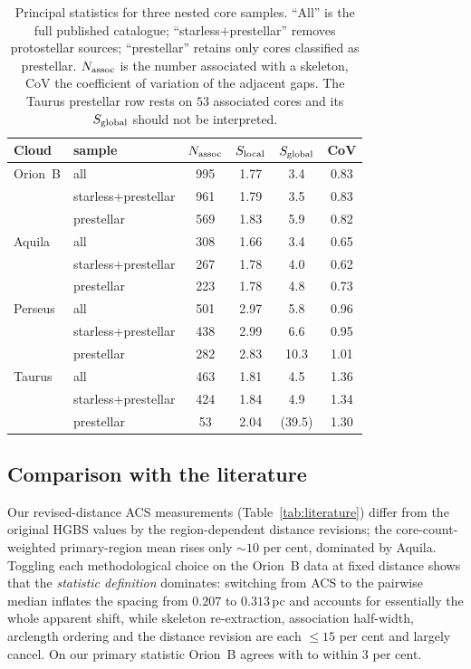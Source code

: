 \documentclass[usenatbib,twoside,twocolumn]{mnras}
\begin{document}
\begin{table}
\caption{Principal statistics for three nested core samples. ``All'' is the full published catalogue; ``starless$+$prestellar'' removes protostellar sources; ``prestellar'' retains only cores classified as prestellar. $N_{\rm assoc}$ is the number associated with a skeleton, CoV the coefficient of variation of the adjacent gaps. The Taurus prestellar row rests on $53$ associated cores and its $S_{\rm global}$ should not be interpreted.}
\label{tab:popsplit}
\footnotesize
\setlength{\tabcolsep}{4pt}
\begin{tabular}{llcccc}
\toprule
Cloud & sample & $N_{\rm assoc}$ & $S_{\rm local}$ & $S_{\rm global}$ & CoV \\
\midrule
Orion~B & all                  & 995 & 1.77 & 3.4 & 0.83 \\
        & starless$+$prestellar& 961 & 1.79 & 3.5 & 0.83 \\
        & prestellar           & 569 & 1.83 & 5.9 & 0.82 \\
\midrule
Aquila  & all                  & 308 & 1.66 & 3.4 & 0.65 \\
        & starless$+$prestellar& 267 & 1.78 & 4.0 & 0.62 \\
        & prestellar           & 223 & 1.78 & 4.8 & 0.73 \\
\midrule
Perseus & all                  & 501 & 2.97 & 5.8 & 0.96 \\
        & starless$+$prestellar& 438 & 2.99 & 6.6 & 0.95 \\
        & prestellar           & 282 & 2.83 & 10.3 & 1.01 \\
\midrule
Taurus  & all                  & 463 & 1.81 & 4.5 & 1.36 \\
        & starless$+$prestellar& 424 & 1.84 & 4.9 & 1.34 \\
        & prestellar           &  53 & 2.04 & (39.5) & 1.30 \\
\bottomrule
\end{tabular}
\end{table}

\subsection{Comparison with the literature}

Our revised-distance ACS measurements (Table~\ref{tab:literature}) differ from the original HGBS values by the region-dependent distance revisions; the core-count-weighted primary-region mean rises only $\sim10$ per cent, dominated by Aquila. Toggling each methodological choice on the Orion~B data at fixed distance shows that the \emph{statistic definition} dominates: switching from ACS to the pairwise median inflates the spacing from $0.207$ to $0.313$\,pc and accounts for essentially the whole apparent shift, while skeleton re-extraction, association half-width, arclength ordering and the distance revision are each $\leq15$ per cent and largely cancel. On our primary statistic Orion~B agrees with \citet{Konyves2020} to within $3$ per cent.
\end{document}
